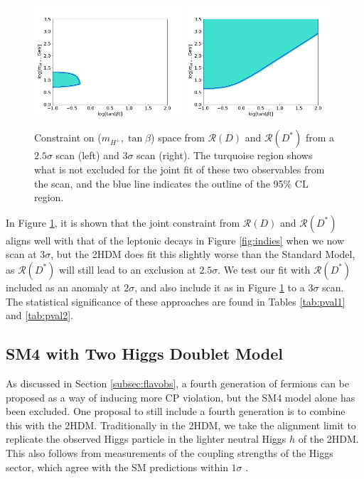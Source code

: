 \documentclass[a4paper,12pt]{article}
\begin{document}
\begin{figure}[ht]
    \centering
    \includegraphics[width=0.49\textwidth]{rd_both25sig.png}
    \includegraphics[width=0.49\textwidth]{rd_both3sig.png}
    \caption{\label{fig:rd3sig}Constraint on ($m_{H^+},\tan\beta$) space from $\mathcal{R}(D)$ and $\mathcal{R}(D^*)$ from a $2.5\sigma$ scan (left) and $3\sigma$ scan (right). 
    The turquoise region shows what is not excluded for the joint fit of these two observables from the scan, and the blue line indicates the outline of the 95\% CL region.}
\end{figure}
In Figure \ref{fig:rd3sig}, it is shown that the joint constraint from $\mathcal{R}(D)$ and $\mathcal{R}(D^*)$ aligns well with that of the leptonic decays in Figure \ref{fig:indies} when we now scan at $3\sigma$, but the 2HDM does fit this slightly worse than the Standard Model, as $\mathcal{R}(D^*)$ will still lead to an exclusion at $2.5\sigma$. 
We test our fit with $\mathcal{R}(D^*)$ included as an anomaly at $2\sigma$, and also include it as in Figure \ref{fig:rd3sig} to a $3\sigma$ scan. 
The statistical significance of these approaches are found in Tables \ref{tab:pval1} and \ref{tab:pval2}.

\subsection{SM4 with Two Higgs Doublet Model}
\label{subsec:wsl}
As discussed in Section \ref{subsec:flavobs}, a fourth generation of fermions can be proposed as a way of inducing more CP violation, but the SM4 model alone has been excluded. 
One proposal to still include a fourth generation is to combine this with the 2HDM. 
Traditionally in the 2HDM, we take the alignment limit to replicate the observed Higgs particle in the lighter neutral Higgs $h$ of the 2HDM.
This also follows from measurements of the coupling strengths of the Higgs sector, which agree with the SM predictions within $1\sigma$ \cite{couple}.
\end{document}
